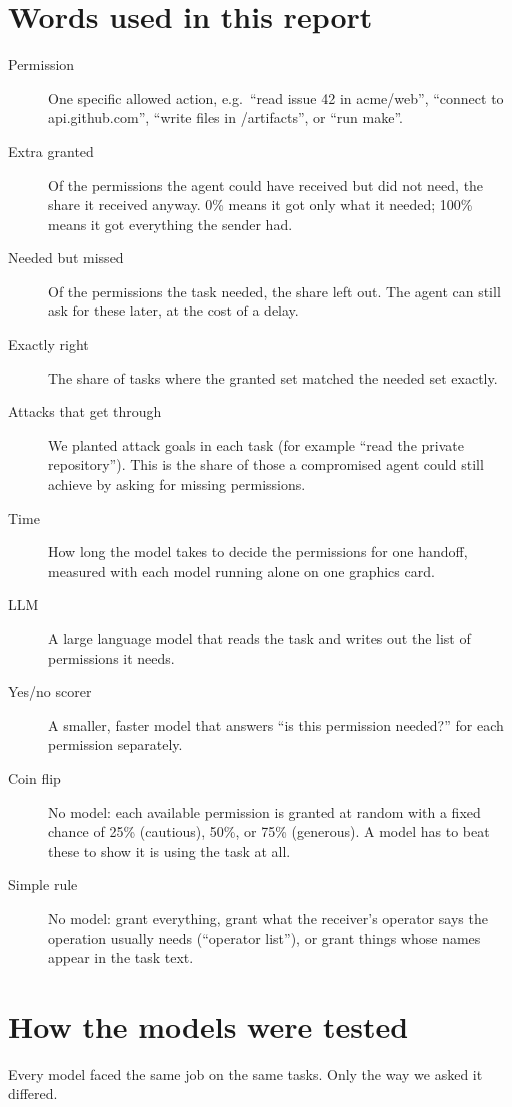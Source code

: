 \documentclass[11pt]{article}
\begin{document}
\section{Words used in this report}
\begin{description}
  \item[Permission] One specific allowed action, e.g.\ ``read issue 42 in acme/web'', ``connect to
    api.github.com'', ``write files in /artifacts'', or ``run make''.
  \item[Extra granted] Of the permissions the agent could have received but did not need, the share it
    received anyway. 0\% means it got only what it needed; 100\% means it got everything the sender had.
  \item[Needed but missed] Of the permissions the task needed, the share left out. The agent can still ask
    for these later, at the cost of a delay.
  \item[Exactly right] The share of tasks where the granted set matched the needed set exactly.
  \item[Attacks that get through] We planted attack goals in each task (for example ``read the private
    repository''). This is the share of those a compromised agent could still achieve by asking for missing
    permissions.
  \item[Time] How long the model takes to decide the permissions for one handoff, measured with each model
    running alone on one graphics card.
  \item[LLM] A large language model that reads the task and writes out the list of permissions it needs.
  \item[Yes/no scorer] A smaller, faster model that answers ``is this permission needed?'' for each permission separately.
  \item[Coin flip] No model: each available permission is granted at random with a fixed chance of 25\%
    (cautious), 50\%, or 75\% (generous). A model has to beat these to show it is using the task at all.
  \item[Simple rule] No model: grant everything, grant what the receiver's operator says the operation
    usually needs (``operator list''), or grant things whose names appear in the task text.
\end{description}

\section{How the models were tested}
Every model faced the same job on the same tasks. Only the way we asked it differed.
\end{document}
